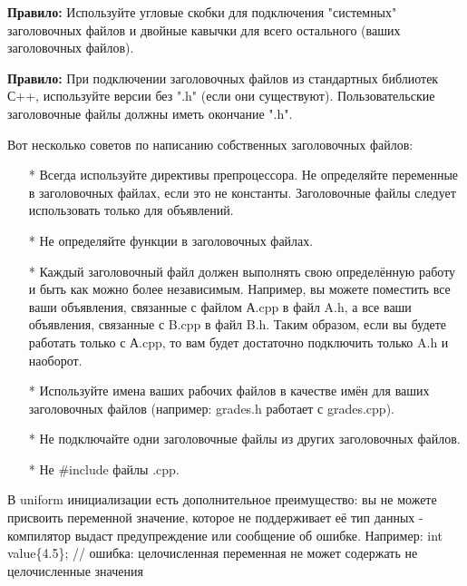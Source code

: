 \documentclass[a4paper,16pt]{report} %
\begin{document}
\begin{sloppypar}
\textbf{Правило:} Используйте угловые скобки для подключения
"системных" заголовочных файлов и двойные кавычки для всего остального (ваших заголовочных файлов).
\end{sloppypar}
\begin{sloppypar}
\textbf{Правило:} При подключении заголовочных файлов из стандартных библиотек С++, используйте версии без ".h" (если они существуют). Пользовательские заголовочные файлы должны иметь окончание ".h".
\end{sloppypar}

Вот несколько советов по написанию собственных заголовочных файлов:
\begin{itemize}
	\item[*]Всегда используйте директивы препроцессора.
Не определяйте переменные в заголовочных файлах, если это не константы. Заголовочные файлы следует использовать только для объявлений.
	\item[*]Не определяйте функции в заголовочных файлах.
	\item[*]Каждый заголовочный файл должен выполнять свою определённую работу и быть как можно более независимым. Например, вы можете поместить все ваши объявления, связанные с файлом А.cpp в файл A.h, а все ваши объявления, связанные с B.cpp в файл B.h. Таким образом, если вы будете работать только с А.cpp, то вам будет достаточно подключить только A.h и наоборот.
	\item[*]Используйте имена ваших рабочих файлов в качестве имён для ваших заголовочных файлов (например: grades.h работает с grades.cpp).
	\item[*]Не подключайте одни заголовочные файлы из других заголовочных файлов.
	\item[*]Не \#include  файлы .cpp.
\end{itemize}
\begin{sloppypar}
	В uniform инициализации есть дополнительное преимущество: вы не можете присвоить переменной значение, которое не поддерживает её тип данных - компилятор выдаст предупреждение или сообщение об ошибке. Например: int value\{4.5\}; // ошибка: целочисленная переменная не может содержать не целочисленные значения
\end{sloppypar}
\end{document}
